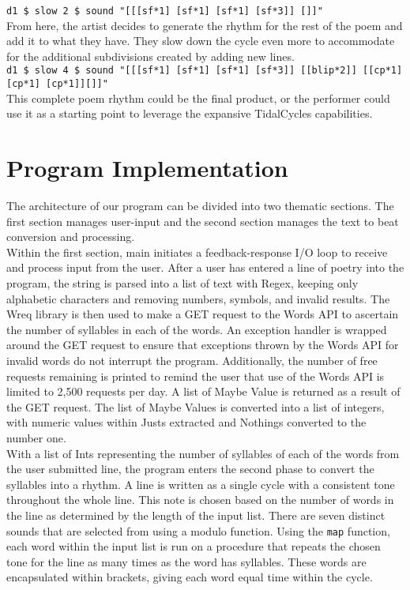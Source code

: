 \documentclass[11pt]{sigplanconf}
\begin{document}
\texttt{d1 \$ slow 2 \$ sound "[[[sf*1] [sf*1] [sf*1] [sf*3]] [\texttildelow]]"} \\

From here, the artist decides to generate the rhythm for the rest of the poem and add it to what they have. They slow down the cycle even more to accommodate for the additional subdivisions created by adding new lines.\\

\texttt{d1 \$ slow 4 \$ sound "[[[sf*1] [sf*1] [sf*1] [sf*3]] [[blip*2]] [[cp*1] [cp*1] [cp*1]][\texttildelow]]"} \\

This complete poem rhythm could be the final product, or the performer could use it as a starting point to leverage the expansive TidalCycles capabilities.



\section{Program Implementation}

The architecture of our program can be divided into two thematic sections. The first section manages user-input and the second section manages the text to beat conversion and processing.  \\

Within the first section, main initiates a feedback-response I/O loop to receive and process input from the user. After a user has entered a line of poetry into the program, the string is parsed into a list of text with Regex, keeping only alphabetic characters and removing numbers, symbols, and invalid results. The Wreq library is then used to make a GET request to the Words API to ascertain the number of syllables in each of the words. An exception handler is wrapped around the GET request to ensure that exceptions thrown by the Words API for invalid words do not interrupt the program. Additionally, the number of free requests remaining is printed to remind the user that use of the Words API is limited to 2,500 requests per day. A list of Maybe Value is returned as a result of the GET request. The list of Maybe Values is converted into a list of integers, with numeric values within Justs extracted and Nothings converted to the number one. \\

With a list of Ints representing the number of syllables of each of the words from the user submitted line, the program enters the second phase to convert the syllables into a rhythm. A line is written as a single cycle with a consistent tone throughout the whole line. This note is chosen based on the number of words in the line as determined by the length of the input list. There are seven distinct sounds that are selected from using a modulo function. Using the \texttt{map} function, each word within the input list is run on a procedure that repeats the chosen tone for the line as many times as the word has syllables. These words are encapsulated within brackets, giving each word equal time within the cycle.
\end{document}
